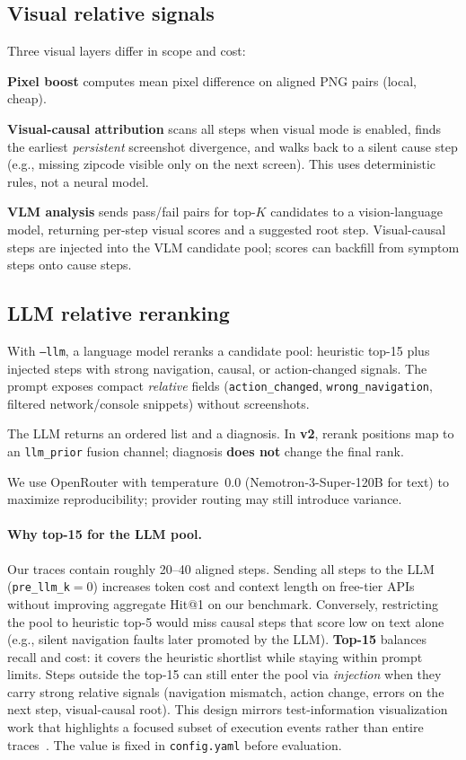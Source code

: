 \documentclass[sigconf,nonacm]{acmart}
\begin{document}
\subsection{Visual relative signals}
\label{sec:visual}

Three visual layers differ in scope and cost:

\textbf{Pixel boost} computes mean pixel difference on aligned PNG pairs (local, cheap).

\textbf{Visual-causal attribution} scans all steps when visual mode is enabled, finds the earliest \emph{persistent} screenshot divergence, and walks back to a silent cause step (e.g., missing zipcode visible only on the next screen).
This uses deterministic rules, not a neural model.

\textbf{VLM analysis} sends pass/fail pairs for top-$K$ candidates to a vision-language model, returning per-step visual scores and a suggested root step.
Visual-causal steps are injected into the VLM candidate pool; scores can backfill from symptom steps onto cause steps.

\subsection{LLM relative reranking}
\label{sec:llm}

With \texttt{--llm}, a language model reranks a candidate pool: heuristic top-15 plus injected steps with strong navigation, causal, or action-changed signals.
The prompt exposes compact \emph{relative} fields (\texttt{action\_changed}, \texttt{wrong\_navigation}, filtered network/console snippets) without screenshots.

The LLM returns an ordered list and a diagnosis.
In \textbf{v2}, rerank positions map to an \texttt{llm\_prior} fusion channel; diagnosis \textbf{does not} change the final rank.

We use OpenRouter with temperature~$0.0$ (Nemotron-3-Super-120B for text) to maximize reproducibility; provider routing may still introduce variance.

\paragraph{Why top-15 for the LLM pool.}
Our traces contain roughly 20--40 aligned steps.
Sending all steps to the LLM (\texttt{pre\_llm\_k}${=}0$) increases token cost and context length on free-tier APIs without improving aggregate Hit@1 on our benchmark.
Conversely, restricting the pool to heuristic top-5 would miss causal steps that score low on text alone (e.g., silent navigation faults later promoted by the LLM).
\textbf{Top-15} balances recall and cost: it covers the heuristic shortlist while staying within prompt limits.
Steps outside the top-15 can still enter the pool via \emph{injection} when they carry strong relative signals (navigation mismatch, action change, errors on the next step, visual-causal root).
This design mirrors test-information visualization work that highlights a focused subset of execution events rather than entire traces~\cite{jones2002visualization}.
The value is fixed in \texttt{config.yaml} before evaluation.
\end{document}
